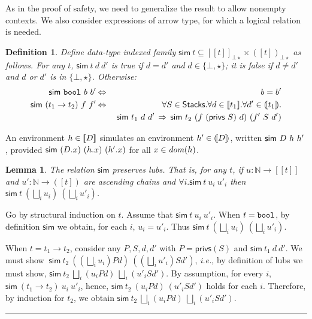 \documentclass[submission,copyright,creativecommons]{eptcs}
\newcommand{\ie}{{\em i.e.}}
\newcommand{\blackslug}{\rule{7pt}{7pt}}
\newcommand{\BOOL}{\mbox{\texttt{bool}}}
\newcommand{\dom}{{\it dom}}
\newcommand{\ldb}{[\![}
\newcommand{\rdb}{]\!]}
\newcommand{\means}[1]{\ldb {#1}\rdb}
\newcommand{\Lub}{\bigsqcup}
\newcommand{\nats}{{\mathbb{N}}}
\newcommand{\privs}{\textsf{privs}}
\newcommand{\Sim}{\textsf{sim}}
\newcommand{\stacks}{\textsf{Stacks}}
\newcommand{\D}{D} \newcommand{\ty}{t} \renewcommand{\th}{\theta}
\newcommand{\meanss}[1]{(\![ {#1}]\!)}
\renewcommand{\implies}{\mathbin{\:\Rightarrow\:}}
\renewcommand{\iff}{\mathbin{\:\Leftrightarrow\:}}
\newtheorem{lemma}[theorem]{Lemma}
\newtheorem{definition}[theorem]{Definition}
\newenvironment{proof}{\begin{trivlist}\item[\hskip\labelsep{\bf
Proof:}]}{\blackslug\end{trivlist}}
\begin{document}
As in the proof of safety, we need to generalize the result to allow
nonempty contexts.  We also consider expressions of arrow type, for
which a logical relation is needed.

\begin{definition} 
Define data-type indexed family 
$\Sim~\ty \subseteq \means{\ty}_{\bot\star}\times\meanss{\ty}_{\bot\star}$ as 
follows.  
For any $\ty$, $\Sim~\ty~d~d'$ is true if $d=d'$ and $d\in\{\bot,\star\}$;
it is false if $d\neq d'$ and $d$ or $d'$ is in $\{\bot,\star\}$.  Otherwise:
\begin{eqnarray*}
\Sim~ {\BOOL}~b~b' &\iff & b=b' \\
\Sim~(\ty_1\to\ty_2)~f~f' &\iff &
\forall S\in\stacks . \forall d\in\means{\ty_1} . \forall d'\in\meanss{\ty_1} . \\
&&  \Sim~\ty_1~d~d' \implies
\Sim~\ty_2~  (f~(\privs~S)~d) ~ (f'~S~d') 
\end{eqnarray*}
\end{definition}
\begin{sloppypar}
An environment $\h\in\means{\D}$ simulates an environment $\h'\in\meanss{\D}$, written 
$\Sim~\D~\h~\h'$, provided $\Sim~(\D.x)~(\h.x)~(\h'.x)$ for all 
$x\in\dom(\h)$.
\end{sloppypar}

\begin{lemma}
\label{lem:lub}
The relation $\Sim$ preserves lubs. That is, for any $\ty$,
if $u:\nats\to\means{\ty}$ and $u':\nats\to\meanss{\ty}$
are ascending chains and  
$\forall i.\Sim~\ty~u_i~u'_i$ then $\Sim~\ty~(\Lub_{i}u_i)~(\Lub_{i}u'_i)$.
\end{lemma}
\begin{proof}
Go by structural induction on $\ty$. Assume that $\Sim~\ty~u_i~u'_i$. When
$\ty=\BOOL$, by definition $\Sim$ we obtain, for each $i$, $u_i=u'_i$.
Thus $\Sim~\ty~(\Lub_{i}u_i)~(\Lub_{i}u'_i)$.

When $\ty=\ty_1\to\ty_2$, consider any $P, S, d, d'$ with $P=\privs(S)$
and $\Sim~\ty_1~d~d'$. We must show 
\linebreak
$~\Sim~\ty_2~((\Lub_{i}u_i) P d)~((\Lub_{i}u'_i) S d')$, \ie, 
by definition of lubs we must show, 
$\Sim~\ty_2~\Lub_{i}(u_i P d)~\Lub_{i}(u'_i S d')$. 
\linebreak
By assumption, for every $i$, $\Sim~(\ty_1\to\ty_2)~u_i~u'_i$, hence, 
$\Sim~\ty_2~(u_i P d)~(u'_i S d')$ holds for each $i$. Therefore, 
\linebreak
by induction for $\ty_2$, we obtain 
$\Sim~\ty_2~\Lub_{i}(u_i P d)~\Lub_{i}(u'_i S d')$.
\end{proof}
\end{document}
